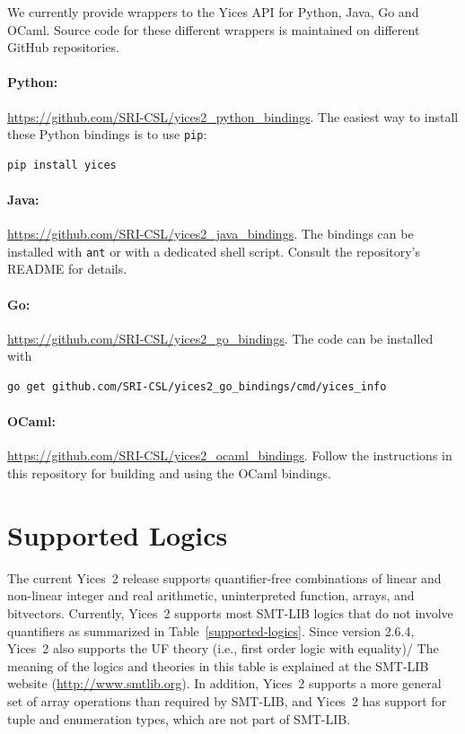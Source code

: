 \documentclass[11pt,twoside,fleqn,openright,titlepage]{cslreport}
\begin{document}
We currently provide wrappers to the Yices API for Python, Java, Go and
OCaml. Source code for these different wrappers is maintained on different GitHub repositories.

\paragraph{Python:} \url{https://github.com/SRI-CSL/yices2_python_bindings}. The easiest way
to install these Python bindings is to use \texttt{pip}:
\begin{small}
\begin{lstlisting}[language=sh]
  pip install yices
\end{lstlisting}
\end{small}

\paragraph{Java:} \url{https://github.com/SRI-CSL/yices2_java_bindings}. The bindings can be
installed with \texttt{ant} or with a dedicated shell script. Consult the repository's README
for details.

\paragraph{Go:} \url{https://github.com/SRI-CSL/yices2_go_bindings}.  The code can be installed with
\begin{small}
\begin{lstlisting}[language=sh]
  go get github.com/SRI-CSL/yices2_go_bindings/cmd/yices_info
\end{lstlisting}
\end{small}

\paragraph{OCaml:} \url{https://github.com/SRI-CSL/yices2_ocaml_bindings}.
Follow the instructions in this repository for building and using the OCaml bindings.

\section{Supported Logics}

The current Yices~2 release supports quantifier-free combinations of
linear and non-linear integer and real arithmetic, uninterpreted
function, arrays, and bitvectors. Currently, Yices~2 supports most
SMT-LIB logics that do not involve quantifiers as summarized in
Table~\ref{supported-logics}.  Since version 2.6.4, Yices~2 also
supports the UF theory (i.e., first order logic with equality)/ The
meaning of the logics and theories in this table is explained at the
SMT-LIB website (\url{http://www.smtlib.org}).  In addition, Yices~2
supports a more general set of array operations than required by
SMT-LIB, and Yices~2 has support for tuple and enumeration types,
which are not part of SMT-LIB.
\end{document}
